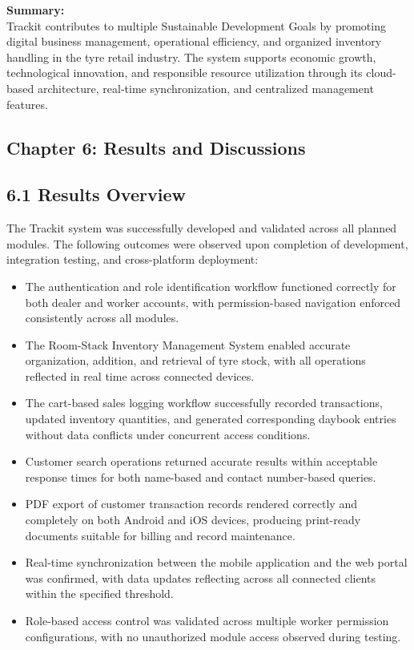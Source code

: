\documentclass[12pt, oneside]{article}
\begin{document}
\textbf{Summary:} \\
Trackit contributes to multiple Sustainable Development Goals by promoting digital business management, operational efficiency, and organized inventory handling in the tyre retail industry. The system supports economic growth, technological innovation, and responsible resource utilization through its cloud-based architecture, real-time synchronization, and centralized management features.

\newpage
\begin{center}
    \section*{Chapter 6: Results and Discussions}
\end{center}

\subsection*{6.1 Results Overview}

The Trackit system was successfully developed and validated across all planned modules. The
following outcomes were observed upon completion of development, integration testing, and
cross-platform deployment:

\begin{itemize}
    \item The authentication and role identification workflow functioned correctly for both dealer
    and worker accounts, with permission-based navigation enforced consistently across all
    modules.
    \item The Room-Stack Inventory Management System enabled accurate organization, addition,
    and retrieval of tyre stock, with all operations reflected in real time across connected
    devices.
    \item The cart-based sales logging workflow successfully recorded transactions, updated
    inventory quantities, and generated corresponding daybook entries without data conflicts
    under concurrent access conditions.
    \item Customer search operations returned accurate results within acceptable response times
    for both name-based and contact number-based queries.
    \item PDF export of customer transaction records rendered correctly and completely on both
    Android and iOS devices, producing print-ready documents suitable for billing and record
    maintenance.
    \item Real-time synchronization between the mobile application and the web portal was
    confirmed, with data updates reflecting across all connected clients within the specified
    threshold.
    \item Role-based access control was validated across multiple worker permission configurations,
    with no unauthorized module access observed during testing.
\end{itemize}
\end{document}
